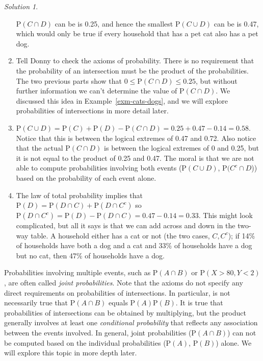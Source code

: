 \documentclass[
  letterpaper,
  DIV=11,
  numbers=noendperiod]{scrreprt}
\theoremstyle{plain}
\theoremstyle{definition}
\theoremstyle{definition}
\theoremstyle{definition}
\theoremstyle{remark}
\newtheorem{refsolution}{Solution}[chapter]
\begin{document}
\begin{tcolorbox}
\begin{refsolution}
\begin{enumerate}
  \(\textrm{P}(C \cap D)\) can be is 0.25, and hence the smallest
  \(\textrm{P}(C\cup D)\) can be is 0.47, which would only be true if
  every household that has a pet cat also has a pet dog.
\item
  Tell Donny to check the axioms of probability. There is no requirement
  that the probability of an intersection must be the product of the
  probabilities. The two previous parts show that
  \(0\le \textrm{P}(C \cap D) \le 0.25\), but without further
  information we can't determine the value of \(\textrm{P}(C\cap D)\).
  We discussed this idea in Example~\ref{exm-cats-dogs}, and we will
  explore probabilities of intersections in more detail later.
\item
  \(\textrm{P}(C \cup D) = \textrm{P}(C) + \textrm{P}(D) - \textrm{P}(C \cap D) = 0.25 + 0.47 - 0.14 = 0.58.\)
  Notice that this is between the logical extremes of 0.47 and 0.72.
  Also notice that the actual \(\textrm{P}(C \cap D)\) is between the
  logical extremes of 0 and 0.25, but it is not equal to the product of
  0.25 and 0.47. The moral is that we are not able to compute
  probabilities involving both events (\(\textrm{P}(C\cup D)\),
  \(\textrm{P}(C^c \cap D\))) based on the probability of each event
  alone.
\item
  The law of total probability implies that
  \(\textrm{P}(D) = \textrm{P}(D \cap C) + \textrm{P}(D \cap C^c)\) so
  \(\textrm{P}(D \cap C^c) = \textrm{P}(D) - \textrm{P}(D \cap C) = 0.47 - 0.14 = 0.33\).
  This might look complicated, but all it says is that we can add across
  and down in the two-way table. A household either has a cat or not
  (the two cases, \(C, C^c\)); if 14\% of households have both a dog and
  a cat and 33\% of households have a dog but no cat, then 47\% of
  households have a dog.
\end{enumerate}

\label{sol-largest-smallest-prob}

\end{refsolution}

\end{tcolorbox}


Probabilities involving multiple events, such as
\(\textrm{P}(A \cap B)\) or \(\textrm{P}(X>80, Y<2)\), are often called
\emph{joint probabilities}. Note that the axioms do not specify any
direct requirements on probabilities of intersections. In particular, is
not necessarily true that \(\textrm{P}(A\cap B)\) equals
\(\textrm{P}(A)\textrm{P}(B)\). It is true that probabilities of
intersections can be obtained by multiplying, but the product generally
involves at least one \emph{conditional probability} that reflects any
association between the events involved. In general, joint probabilities
(\(\textrm{P}(A \cap B)\)) can not be computed based on the individual
probabilities (\(\textrm{P}(A)\), \(\textrm{P}(B)\)) alone. We will
explore this topic in more depth later.
\end{document}
